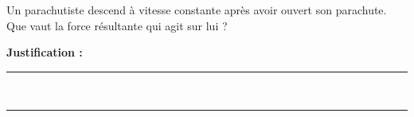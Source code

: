 Un parachutiste descend à vitesse constante après avoir ouvert son parachute. Que vaut la force résultante qui agit sur lui ?

\choices

\noindent\textbf{Justification :} \hrulefill \\[2.5ex]
\rule{\linewidth}{0.4pt} \\[2.5ex]
\rule{\linewidth}{0.4pt}
\vfill
